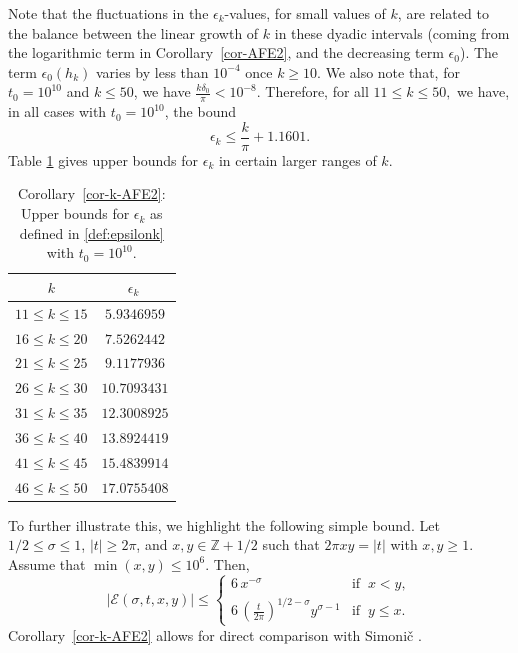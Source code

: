 \documentclass[11pt,letterpaper,oneside,reqno]{amsart}
\renewcommand{\^}[1]{\widehat{#1}}
\numberwithin{equation}{section}
\theoremstyle{remark}
\newcommand*{\corref}[1]{Corollary~\ref{#1}}
\begin{document}
Note that the fluctuations in the $\epsilon_k$-values, for small values of $k$, are related to the balance between the linear growth of $k$ in these dyadic intervals (coming from the logarithmic term in \corref{cor-AFE2}, and the decreasing term $\epsilon_0$). The term $\epsilon_0(h_k)$ varies by less than $10^{-4}$ once $k\ge 10$. We also note that, for $t_0=10^{10}$ and $k\le 50$, we have $\frac{k\delta_0}{\pi}<10^{-8}.$ Therefore, for all $11\le k \le 50,$ we have, in all cases with $t_0= 10^{10}$, the bound
\begin{equation}\label{eq:ek-largeK}
    \epsilon_k \le \frac{k}{\pi} + 1.1601 .%
\end{equation}
%
Table \ref{tab:Epsilon_k-large} gives upper bounds for $\epsilon_k$ in certain larger ranges of $k$.
\begin{table}[H] 
\centering
\caption{\corref{cor-k-AFE2}: Upper bounds for $\epsilon_k$ as defined in \eqref{def:epsilonk} with $t_0 = 10^{10}$.} 
\label{tab:Epsilon_k-large}
\begin{tabular}{|c|c|}
\hline
$k$ & $\epsilon_k\ $ \\
\hline
$11\le k \le 15$ &  $5.9346959$ \\
$16\le k \le 20$ &  $7.5262442$ \\
$21\le k \le 25$ &  $9.1177936$ \\
$26\le k \le 30$ &  $10.7093431$ \\
$31\le k \le 35$ &  $12.3008925$ \\
$36\le k \le 40$ &  $13.8924419$ \\
$41\le k \le 45$ &  $15.4839914$ \\
$46\le k \le 50$ &  $17.0755408$ \\
\hline
\end{tabular}
\end{table}
To further illustrate this, we highlight the following simple bound. Let $1/2 \le \sigma \le 1$, $|t| \ge 2\pi$, and  $x, y \in \mathbb{Z} + 1/2$ such that $2\pi xy = |t|$ with $x, y \ge 1$. Assume that $\min(x,y)\le 10^6$. Then,
\begin{equation}\label{eq:AFE2-simple}
|\mathcal{E}(\sigma, t, x, y)| \le 
\begin{cases}
6\, x^{-\sigma}& \text{if }\  x<y , \\
6 \, \left(\frac{t}{2\pi}\right)^{1/2 - \sigma} y^{\sigma - 1} & \text{if }\ y \le x .
\end{cases}
\end{equation}
%
\corref{cor-k-AFE2} allows for direct comparison with Simoni{\v{c}} \cite[Theorem 4, Theorem 6, Tables 2--4]{Simonic2020}. 
\end{document}
